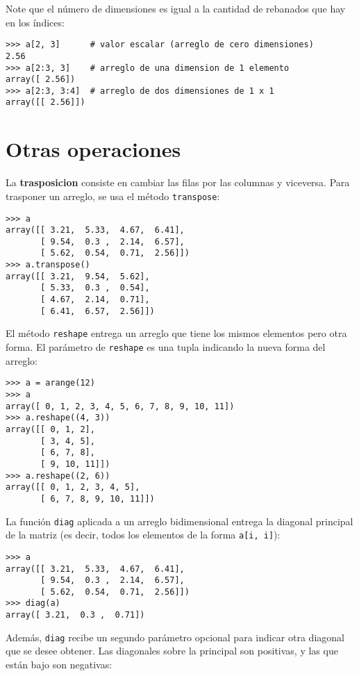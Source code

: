 Note que el número de dimensiones es igual a la cantidad de rebanados
que hay en los índices:

\begin{lstlisting}
>>> a[2, 3]      # valor escalar (arreglo de cero dimensiones)
2.56
>>> a[2:3, 3]    # arreglo de una dimension de 1 elemento
array([ 2.56])
>>> a[2:3, 3:4]  # arreglo de dos dimensiones de 1 x 1
array([[ 2.56]])
\end{lstlisting}

\section{Otras operaciones}

La \textbf{trasposicion} consiste en cambiar las filas por las columnas
y viceversa. Para trasponer un arreglo, se usa el método
\lstinline!transpose!:

\begin{lstlisting}
>>> a
array([[ 3.21,  5.33,  4.67,  6.41],
       [ 9.54,  0.3 ,  2.14,  6.57],
       [ 5.62,  0.54,  0.71,  2.56]])
>>> a.transpose()
array([[ 3.21,  9.54,  5.62],
       [ 5.33,  0.3 ,  0.54],
       [ 4.67,  2.14,  0.71],
       [ 6.41,  6.57,  2.56]])
\end{lstlisting}

El método \lstinline!reshape! entrega un arreglo que tiene los mismos
elementos pero otra forma. El parámetro de \lstinline!reshape! es una
tupla indicando la nueva forma del arreglo:

\begin{lstlisting}
>>> a = arange(12)
>>> a
array([ 0, 1, 2, 3, 4, 5, 6, 7, 8, 9, 10, 11])
>>> a.reshape((4, 3))
array([[ 0, 1, 2],
       [ 3, 4, 5],
       [ 6, 7, 8],
       [ 9, 10, 11]])
>>> a.reshape((2, 6))
array([[ 0, 1, 2, 3, 4, 5],
       [ 6, 7, 8, 9, 10, 11]])
\end{lstlisting}

La función \lstinline!diag! aplicada a un arreglo bidimensional entrega
la diagonal principal de la matriz (es decir, todos los elementos de la
forma \lstinline!a[i, i]!):

\begin{lstlisting}
>>> a
array([[ 3.21,  5.33,  4.67,  6.41],
       [ 9.54,  0.3 ,  2.14,  6.57],
       [ 5.62,  0.54,  0.71,  2.56]])
>>> diag(a)
array([ 3.21,  0.3 ,  0.71])
\end{lstlisting}

Además, \lstinline!diag! recibe un segundo parámetro opcional para
indicar otra diagonal que se desee obtener. Las diagonales sobre la
principal son positivas, y las que están bajo son negativas:

